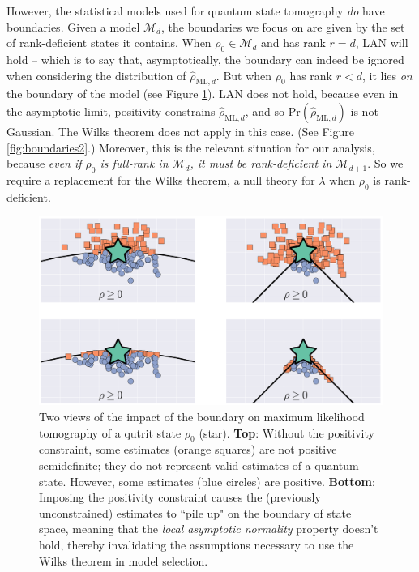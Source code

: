 \documentclass[aps,pra, twocolumn]{revtex4-1}
\newcommand{\M}{\mathcal{M}}
\newcommand{\rhohat}{\hat{\rho}}
\newcommand{\rhoML}[1]{\rhohat_{\scriptscriptstyle{\mathrm{ML},#1}}}
\begin{document}
However, the statistical models used for quantum state tomography \emph{do} have boundaries. Given a model $\M_{d}$, the boundaries we focus on are given by the set of rank-deficient states it contains. When $\rho_{0}\in \M_{d}$ and has rank $r = d$, LAN will hold -- which is to say that, asymptotically, the boundary can indeed be ignored when considering the distribution of $\rhoML{d}$. But when $\rho_{0}$ has rank $r<d$, it lies \emph{on} the boundary of the model (see Figure \ref{fig:boundaries}).  LAN does not hold, because even in the asymptotic limit, positivity constrains $\rhoML{d}$, and so $\mathrm{Pr}(\rhoML{d})$ is not Gaussian.  The Wilks theorem does not apply in this case.  (See Figure \ref{fig:boundaries2}.) Moreover, this is the relevant situation for our analysis, because \emph{even if $\rho_{0}$ is full-rank in $\M_{d}$, it must be rank-deficient in $\M_{d+1}$}.  So we require a replacement for the Wilks theorem, a null theory for $\lambda$ when $\rho_0$ is rank-deficient. 

\begin{figure}[h]
\includegraphics[width=\columnwidth]{Images/Figure_1.pdf}
 \caption{Two views of the impact of the boundary on maximum likelihood tomography of a qutrit state $\rho_{0}$ (star). \textbf{Top}: Without the positivity constraint, some estimates (orange squares) are not positive semidefinite; they do not represent valid estimates of a quantum state. However, some estimates (blue circles) are positive.
\textbf{Bottom}:  Imposing the positivity constraint causes the (previously unconstrained) estimates to ``pile up" on the boundary of state space, meaning that the \emph{local asymptotic normality} property doesn't hold, thereby invalidating the assumptions necessary to use the Wilks theorem in model selection.}
\label{fig:boundaries}
\end{figure}
\end{document}
